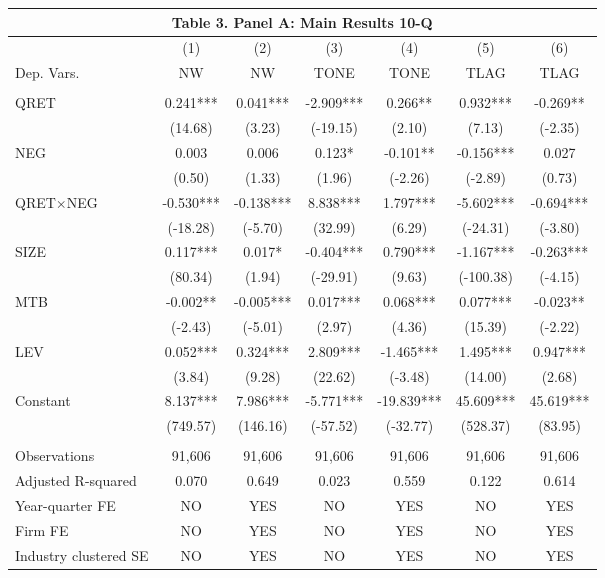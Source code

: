 \begin{table}[htbp] \label{T3PA}
  \centering
    \begin{tabular}{lcccccc}
    \multicolumn{7}{c}{\textbf{Table 3. Panel A: Main Results 10-Q}} \\
    \midrule
      & (1) & (2) & (3) & (4) & (5) & (6) \\
    Dep. Vars. & NW & NW & TONE & TONE & TLAG & TLAG \\
    \midrule
      &   &   &   &   &   &  \\
    QRET & 0.241*** & 0.041*** & -2.909*** & 0.266** & 0.932*** & -0.269** \\
      & (14.68) & (3.23) & (-19.15) & (2.10) & (7.13) & (-2.35) \\
    NEG & 0.003 & 0.006 & 0.123* & -0.101** & -0.156*** & 0.027 \\
      & (0.50) & (1.33) & (1.96) & (-2.26) & (-2.89) & (0.73) \\
    \rowcolor[rgb]{ .933,  .925,  .882} QRET$\times$NEG & -0.530*** & -0.138*** & 8.838*** & 1.797*** & -5.602*** & -0.694*** \\
    \rowcolor[rgb]{ .933,  .925,  .882}   & (-18.28) & (-5.70) & (32.99) & (6.29) & (-24.31) & (-3.80) \\
    SIZE & 0.117*** & 0.017* & -0.404*** & 0.790*** & -1.167*** & -0.263*** \\
      & (80.34) & (1.94) & (-29.91) & (9.63) & (-100.38) & (-4.15) \\
    MTB & -0.002** & -0.005*** & 0.017*** & 0.068*** & 0.077*** & -0.023** \\
      & (-2.43) & (-5.01) & (2.97) & (4.36) & (15.39) & (-2.22) \\
    LEV & 0.052*** & 0.324*** & 2.809*** & -1.465*** & 1.495*** & 0.947*** \\
      & (3.84) & (9.28) & (22.62) & (-3.48) & (14.00) & (2.68) \\
    Constant & 8.137*** & 7.986*** & -5.771*** & -19.839*** & 45.609*** & 45.619*** \\
      & (749.57) & (146.16) & (-57.52) & (-32.77) & (528.37) & (83.95) \\
      &   &   &   &   &   &  \\
    Observations & 91,606 & 91,606 & 91,606 & 91,606 & 91,606 & 91,606 \\
    Adjusted R-squared & 0.070 & 0.649 & 0.023 & 0.559 & 0.122 & 0.614 \\
    Year-quarter FE & NO & YES & NO & YES & NO & YES \\
    Firm FE & NO & YES & NO & YES & NO & YES \\
    Industry clustered SE & NO & YES & NO & YES & NO & YES \\
    \bottomrule
    \end{tabular}%
\end{table}%
